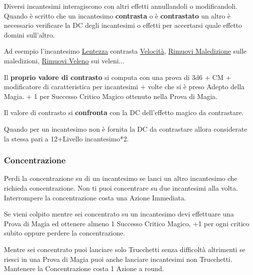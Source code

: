 \begin{multicols}{2}
Diversi incantesimi interagiscono con altri effetti annullandoli o modificandoli. Quando è scritto che un incantesimo \textbf{contrasta} o è \textbf{contrastato} un altro è necessario verificare la DC degli incantesimi o effetti per accertarsi quale effetto domini sull'altro.

Ad esempio l'incantesimo \hyperlink{Lentezza}{Lentezza} contrasta \hyperlink{Velocità}{Velocità}, \hyperlink{Rimuovi Maledizione}{Rimuovi Maledizione} sulle maledizioni, \hyperlink{Rimuovi Veleno}{Rimuovi Veleno} sui veleni...

Il \textbf{proprio valore di contrasto} si computa con una prova di 3d6 + CM + modificatore di caratteristica per incantesimi + volte che si è preso Adepto della Magia. + 1 per Successo Critico Magico ottenuto nella Prova di Magia.

Il valore di contrasto si \textbf{confronta} con la DC dell'effetto magico da contrastare.

Quando per un incantesimo non è fornita la DC da contrastare allora considerate la stessa pari a 12+Livello incantesimo*2.

\subsubsection{Concentrazione}\label{magieconcentrazione}\hypertarget{magieconcentrazione}{}

Perdi la concentrazione su di un incantesimo se lanci un altro incantesimo che richieda concentrazione. Non ti puoi concentrare su due incantesimi alla volta. Interrompere la concentrazione costa una Azione Immediata.

Se vieni colpito mentre sei concentrato su un incantesimo devi effettuare una Prova di Magia ed ottenere almeno 1 Successo Critico Magico, +1 per ogni critico subito oppure perdere la concentrazione.


Mentre sei concentrato puoi lanciare solo Trucchetti senza difficoltà altrimenti se riesci in una Prova di Magia puoi anche lanciare incantesimi non Trucchetti. Mantenere la Concentrazione costa 1 Azione a round. 


\end{multicols}
